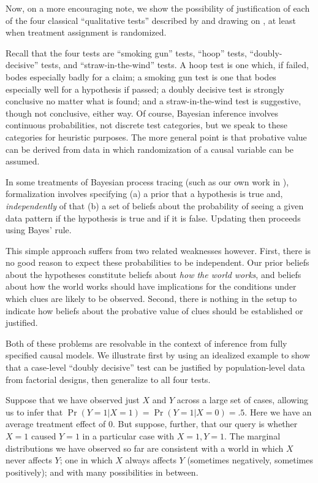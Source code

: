 \documentclass[
  12pt,
]{book}
\begin{document}
Now, on a more encouraging note, we show the possibility of justification of each of the four classical ``qualitative tests'' described by \citet{collier2011understanding} and drawing on \citet{Van-Evera:1997}, at least when treatment assignment is randomized.

Recall that the four tests are ``smoking gun'' tests, ``hoop'' tests, ``doubly-decisive'' tests, and ``straw-in-the-wind'' tests. A hoop test is one which, if failed, bodes especially badly for a claim; a smoking gun test is one that bodes especially well for a hypothesis if passed; a doubly decisive test is strongly conclusive no matter what is found; and a straw-in-the-wind test is suggestive, though not conclusive, either way. Of course, Bayesian inference involves continuous probabilities, not discrete test categories, but we speak to these categories for heuristic purposes. The more general point is that probative value can be derived from data in which randomization of a causal variable can be assumed.

In some treatments of Bayesian process tracing (such as our own work in \citet{humphreys2015mixing}), formalization involves specifying (a) a prior that a hypothesis is true and, \emph{independently} of that (b) a set of beliefs about the probability of seeing a given data pattern if the hypothesis is true and if it is false. Updating then proceeds using Bayes' rule.

This simple approach suffers from two related weaknesses however. First, there is no good reason to expect these probabilities to be independent. Our prior beliefs about the hypotheses constitute beliefs about \emph{how the world works}, and beliefs about how the world works should have implications for the conditions under which clues are likely to be observed. Second, there is nothing in the setup to indicate how beliefs about the probative value of clues should be established or justified.

Both of these problems are resolvable in the context of inference from fully specified causal models. We illustrate first by using an idealized example to show that a case-level ``doubly decisive'' test can be justified by population-level data from factorial designs, then generalize to all four tests.

Suppose that we have observed just \(X\) and \(Y\) across a large set of cases, allowing us to infer that \(\Pr(Y=1|X=1) = \Pr(Y=1|X=0) = .5\). Here we have an average treatment effect of 0. But suppose, further, that our query is whether \(X=1\) caused \(Y=1\) in a particular case with \(X=1, Y=1\). The marginal distributions we have observed so far are consistent with a world in which \(X\) never affects \(Y\); one in which \(X\) always affects \(Y\) (sometimes negatively, sometimes positively); and with many possibilities in between.
\end{document}
